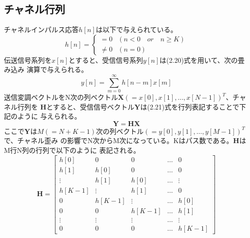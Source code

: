 \subsection{チャネル行列}
チャネルインパルス応答$h[n]$は以下で与えられている。
\begin{equation}
    h[n] = \left\{
        \begin{array}{ll}
            = 0 & (n<0 \quad or \quad n \geq K) \\
            \neq 0 & (n=0)
        \end{array}
    \right.
\end{equation}
伝送信号系列を$x[n]$とすると、受信信号系列$y[n]$は(2.20)式を用いて、次の畳み込み
演算で与えられる。
\begin{equation}
    y[n] = \sum_{m=0}^\infty h[n-m]x[m]
\end{equation}
送信変調ベクトルをN次の列ベクトル$\bm{X}(=x[0],x[1],\ldots,x[N-1])^T$、チャネル行列を
$\bm{H}$とすると、受信信号ベクトル$\bm{Y}$は(2.21)式を行列表記することで下記のように
与えられる。
\begin{equation}
    \bm{Y} = \bm{HX}
\end{equation}
ここで$\bm{Y}$は$M(=N+K-1)$次の列ベクトル$(=y[0],y[1],\ldots,y[M-1])^T$で、チャネル歪み
の影響でN次からM次になっている。Kはパス数である。$\bm{H}$はM行N列の行列で以下のように
表記される。
\begin{equation}
    \bm{H} = \left[
        \begin{array}{ccccc}
            h[0] & 0 & 0 & \ldots & 0 \\
            h[1] & h[0] & 0 & \ldots & 0 \\
            \vdots & h[1] & h[0] & \ldots & \vdots \\
            h[K-1] & \vdots & h[1] & \ldots & 0 \\
            0 & h[K-1] & \vdots & \ldots & h[0] \\
            0 & 0 & h[K-1] & \ldots & h[1] \\
            \vdots & \vdots & \vdots & \ldots & \vdots \\
            0 & 0 & 0 & \ldots & h[K-1]
        \end{array}
    \right]
\end{equation}

